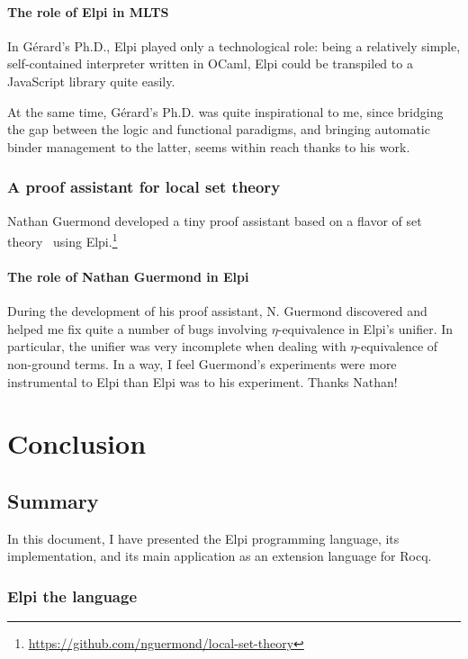 \documentclass{these-ISSS}
\begin{document}
\subsubsection{The role of Elpi in MLTS}

In G\'{e}rard's Ph.D., Elpi played only a technological role: being a
relatively simple, self-contained interpreter written in OCaml, Elpi could be
transpiled to a JavaScript library quite easily.

At the same time, G\'{e}rard's Ph.D. was quite inspirational to me, since
bridging the gap between the logic and functional paradigms, and bringing
automatic binder management to the latter, seems within reach thanks to his
work.


\subsection{A proof assistant for local set theory}

Nathan Guermond developed a tiny proof assistant based on a flavor of set
theory~\cite{https://doi.org/10.1112/blms/22.1.101} using
Elpi.\footnote{\url{https://github.com/nguermond/local-set-theory}}


\subsubsection{The role of Nathan Guermond in Elpi}

During the development of his proof assistant, N. Guermond discovered and
helped me fix quite a number of bugs involving $\eta$-equivalence in Elpi's
unifier. In particular, the unifier was very incomplete when dealing with
$\eta$-equivalence of non-ground terms. In a way, I feel Guermond's
experiments were more instrumental to Elpi than Elpi was to his experiment.
Thanks Nathan!

\chapter{Conclusion}

\section{Summary}


In this document, I have presented the Elpi programming language, its
implementation, and its main application as an extension language for Rocq.

\subsection{Elpi the language}
\end{document}

